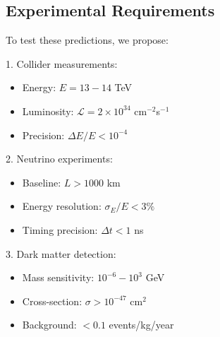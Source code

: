 \documentclass[12pt]{article}
\begin{document}
\subsection{Experimental Requirements}

To test these predictions, we propose:

1. Collider measurements:
   \begin{itemize}
   \item Energy: $E = 13-14$ TeV
   \item Luminosity: $\mathcal{L} = 2 \times 10^{34}$ cm$^{-2}$s$^{-1}$
   \item Precision: $\Delta E/E < 10^{-4}$
   \end{itemize}

2. Neutrino experiments:
   \begin{itemize}
   \item Baseline: $L > 1000$ km
   \item Energy resolution: $\sigma_E/E < 3\%$
   \item Timing precision: $\Delta t < 1$ ns
   \end{itemize}

3. Dark matter detection:
   \begin{itemize}
   \item Mass sensitivity: $10^{-6} - 10^{3}$ GeV
   \item Cross-section: $\sigma > 10^{-47}$ cm$^2$
   \item Background: $< 0.1$ events/kg/year
   \end{itemize}
\end{document}
